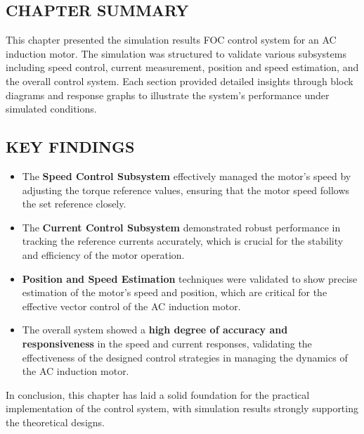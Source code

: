 \subsection{CHAPTER SUMMARY}

This chapter presented the simulation results FOC control system for an AC induction motor. The simulation was structured to validate various subsystems including speed control, current measurement, position and speed estimation, and the overall control system. Each section provided detailed insights through block diagrams and response graphs to illustrate the system's performance under simulated conditions.

\subsection{KEY FINDINGS}

\begin{itemize}
    \item The \textbf{Speed Control Subsystem} effectively managed the motor's speed by adjusting the torque reference values, ensuring that the motor speed follows the set reference closely.
    \item The \textbf{Current Control Subsystem} demonstrated robust performance in tracking the reference currents accurately, which is crucial for the stability and efficiency of the motor operation.
    \item \textbf{Position and Speed Estimation} techniques were validated to show precise estimation of the motor's speed and position, which are critical for the effective vector control of the AC induction motor.
    \item The overall system showed a \textbf{high degree of accuracy and responsiveness} in the speed and current responses, validating the effectiveness of the designed control strategies in managing the dynamics of the AC induction motor.
\end{itemize}

In conclusion, this chapter has laid a solid foundation for the practical implementation of the control system, with simulation results strongly supporting the theoretical designs.


\newpage